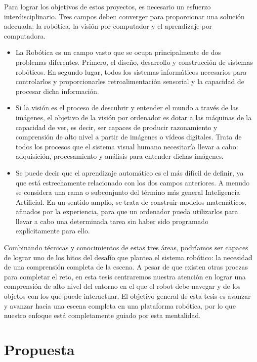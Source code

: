 Para lograr los objetivos de estos proyectos, es necesario un esfuerzo interdisciplinario. Tres campos deben converger para proporcionar una solución adecuada: la robótica, la visión por computador y el aprendizaje por computadora.

\begin{itemize}
	\item La Robótica es un campo vasto que se ocupa principalmente de dos problemas diferentes. Primero, el diseño, desarrollo y construcción de sistemas robóticos. En segundo lugar, todos los sistemas informáticos necesarios para controlarlos y proporcionarles retroalimentación sensorial y la capacidad de procesar dicha información.

	\item Si la visión es el proceso de descubrir y entender el mundo a través de las imágenes, el objetivo de la visión por ordenador es dotar a las máquinas de la capacidad de ver, es decir, ser capaces de producir razonamiento y comprensión de alto nivel a partir de imágenes o vídeos digitales. Trata de todos los procesos que el sistema visual humano necesitaría llevar a cabo: adquisición, procesamiento y análisis para entender dichas imágenes.

	\item Se puede decir que el aprendizaje automático es el más difícil de definir, ya que está estrechamente relacionado con los dos campos anteriores. A menudo se considera una rama o subconjunto del término más general Inteligencia Artificial. En un sentido amplio, se trata de construir modelos matemáticos, afinados por la experiencia, para que un ordenador pueda utilizarlos para llevar a cabo una determinada tarea sin haber sido programado explícitamente para ello.
\end{itemize}

Combinando técnicas y conocimientos de estas tres áreas, podríamos ser capaces de lograr uno de los hitos del desafío que plantea el sistema robótico: la necesidad de una comprensión completa de la escena. A pesar de que existen otras proezas para completar el reto, en esta tesis centraremos nuestra atención en lograr una comprensión de alto nivel del entorno en el que el robot debe navegar y de los objetos con los que puede interactuar. El objetivo general de esta tesis es avanzar y avanzar hacia una escena completa en una plataforma robótica, por lo que nuestro enfoque está completamente guiado por esta mentalidad.

\section{Propuesta}

